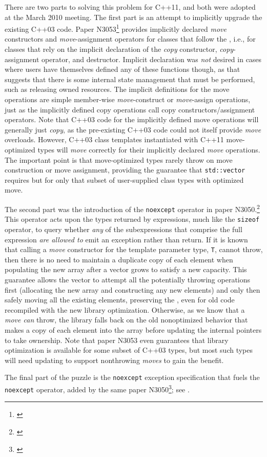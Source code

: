 There are two parts to solving this problem for C++11, and both were
adopted at the March 2010 meeting. The first part is an attempt to
implicitly upgrade the existing C++03 code. Paper N3053\footnote{\cite{stroustrup10}} provides implicitly declared \emph{move} constructors and
\emph{move}-assignment operators for classes that follow the
, i.e., for classes that rely on the implicit
declaration of the \emph{copy} constructor, \emph{copy}-assignment
operator, and destructor. Implicit declaration was \emph{not} desired in
cases where users have themselves defined any of these functions though,
as that suggests that there is some internal state management that must
be performed, such as releasing owned resources. The implicit
definitions for the move operations are simple member-wise
\emph{move}-construct or \emph{move}-assign operations, just as the
implicitly defined copy operations call copy constructors/assignment
operators. Note that C++03 code for the implicitly defined move
operations will generally just \emph{copy}, as the pre-existing C++03
code could not itself provide \emph{move} overloads. However, C++03
class templates instantiated with C++11 move-optimized types will
\emph{move} correctly for their implicitly declared \emph{move}
operations. The important point is that move-optimized types rarely
throw on move construction or move assignment, providing the guarantee
that \lstinline!std::vector! requires but for only that subset of
user-supplied class types with optimized move.

The second part was the introduction of the \lstinline!noexcept! operator
in paper N3050.\footnote{\cite{abrahams10}} This
operator acts upon the types returned by expressions, much like the
\lstinline!sizeof! operator, to query whether \emph{any} of the
subexpressions that comprise the full expression \emph{are allowed to}
emit an exception rather than return. If it is known that calling a
\emph{move} constructor for the template parameter type, \lstinline!T!,
cannot throw, then there is no need to maintain a duplicate copy of each
element when populating the new array after a vector grows to satisfy a
new capacity. This guarantee allows the vector to attempt all the
potentially throwing operations first (allocating the new array and
constructing any new elements) and only then safely moving all the
existing elements, preserving the , even for old code recompiled with the new library
optimization. Otherwise, as we know that a \emph{move can} throw, the
library falls back on the old nonoptimized behavior that makes a copy of
each element into the array before updating the internal pointers to
take ownership. Note that paper N3053 even guarantees that library
optimization is available for some subset of C++03 types, but most such
types will need updating to support nonthrowing \emph{moves} to gain the
benefit.

The final part of the puzzle is the \lstinline!noexcept! exception
specification that fuels the \lstinline!noexcept! operator, added by the
same paper N3050\footnote{\cite{abrahams10}}; see .


